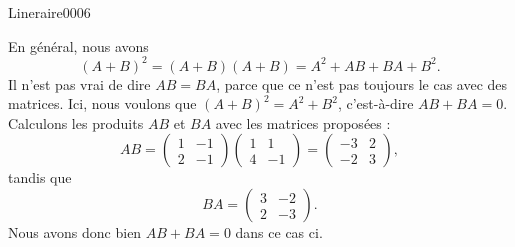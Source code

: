 \begin{corrige}{Lineraire0006}

	En général, nous avons
	\begin{equation}
		(A+B)^2=(A+B)(A+B)=A^2+AB+BA+B^2.
	\end{equation}
	Il n'est pas vrai de dire $AB=BA$, parce que ce n'est pas toujours le cas avec des matrices. Ici, nous voulons que $(A+B)^2=A^2+B^2$, c'est-à-dire $AB+BA=0$. Calculons les produits $AB$ et $BA$ avec les matrices proposées :
	\begin{equation}
		AB=\begin{pmatrix}
			1	&	-1	\\ 
			2	&	-1	
		\end{pmatrix}
		\begin{pmatrix}
			1	&	1	\\ 
			4	&	-1	
		\end{pmatrix}=
		\begin{pmatrix}
			-3	&	2	\\ 
			-2	&	3	
		\end{pmatrix},
	\end{equation}
	tandis que
	\begin{equation}
		BA=\begin{pmatrix}
			3	&	-2	\\ 
			2	&	-3	
		\end{pmatrix}.
	\end{equation}
	Nous avons donc bien $AB+BA=0$ dans ce cas ci.


\end{corrige}

